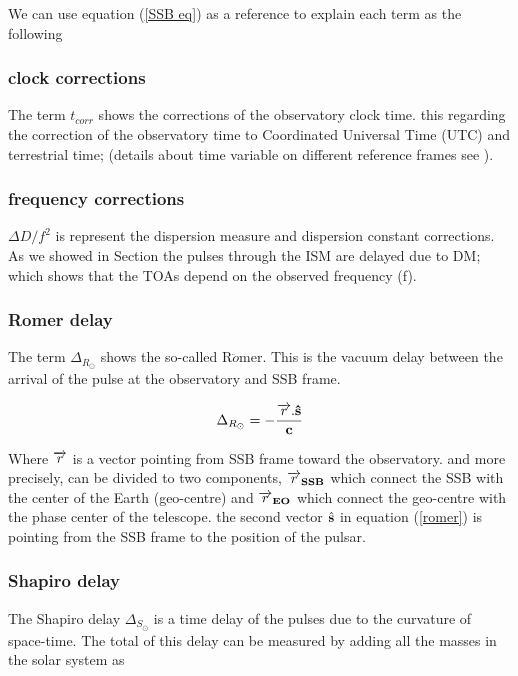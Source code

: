 We can use equation (\ref{SSB eq}) as a reference to explain each term as the following

\subsubsection*{clock corrections}
The term $t_{corr}$ shows the corrections of the observatory clock time. this regarding the correction of the observatory time to Coordinated Universal Time (UTC) and terrestrial time; (details about time variable on different reference frames see \citet{mccarthy2004iers}).

\subsubsection*{frequency corrections}
$\Delta D/f^2 $ is represent the dispersion measure and dispersion constant corrections. As we showed in Section  the pulses through the ISM are delayed due to DM; which shows that the TOAs depend on the observed frequency (f).   


\subsubsection*{Romer delay}
 The term $\Delta_{R_{\odot}}$ shows the so-called R$\ddot{o}$mer. This is the vacuum delay between the arrival of the pulse at the observatory and SSB frame.  

\begin{equation}
\label{romer}
\Delta_{R_{\odot}} = - \frac{\bf{\overrightarrow r}.  \hat{\bf s}}{\bf c}
\end{equation}

  Where $\bf{\overrightarrow r}$ is a vector pointing from SSB frame toward the observatory. and more precisely, can be divided to two components, $\bf{\overrightarrow r_{SSB}}$ which connect the SSB with the center of the Earth (geo-centre) and $\bf{\overrightarrow r_{EO}}$ which connect the geo-centre with the phase center of the telescope. the second vector $\hat{\bf s}$ in equation (\ref{romer}) is pointing from the SSB frame to the position of the pulsar.  


\subsubsection*{Shapiro delay}
The Shapiro delay  $\Delta_{S_{\odot}}$
is a time delay of the pulses due to the curvature of space-time. The total of this delay can be measured by adding all the masses in the solar system as 

